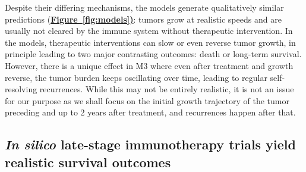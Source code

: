 \documentclass[a4paper,10pt]{article}
\newcommand{\myref}[2]{\hyperref[#1]{\bfseries Figure~\ref*{#1}#2}}
\begin{document}
Despite their differing mechanisms, the models generate qualitatively
similar predictions (\myref{fig:models}): tumors grow at realistic
speeds and are usually not cleared by the immune system without therapeutic intervention.
In the models, therapeutic interventions can slow or even reverse tumor growth, 
in principle leading  to two major contrasting outcomes: death or long-term survival. 
However, there is a unique effect in M3 where even after treatment and growth 
reverse, the tumor burden keeps oscillating over time, leading to regular self-resolving
recurrences. While this may not be entirely realistic, it is not an issue for our 
purpose as we shall focus on 
the initial growth trajectory of the tumor preceding and up to
2 years after treatment, and recurrences happen after that.

\subsection*{\emph{In silico} late-stage immunotherapy trials yield realistic survival outcomes}
\end{document}
